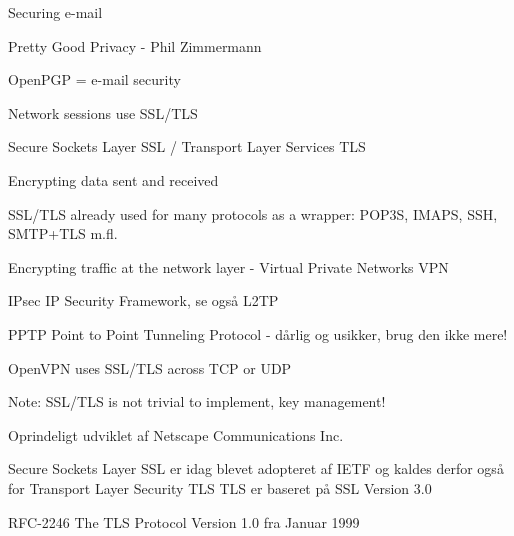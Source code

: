 \documentclass[20pt,landscape,a4paper,footrule]{foils}
\begin{document}
\begin{list1}
\item Securing e-mail
\begin{list2}
\item Pretty Good Privacy - Phil Zimmermann
\item OpenPGP = e-mail security
\end{list2}
\item Network sessions use SSL/TLS
\begin{list2}
\item Secure Sockets Layer SSL / Transport Layer Services TLS
\item Encrypting data sent and received
\item SSL/TLS already used for many protocols as a wrapper: POP3S, IMAPS, SSH, SMTP+TLS m.fl.
\end{list2}
\item Encrypting traffic at the network layer - Virtual Private Networks VPN
\begin{list2}
\item {\color{green}IPsec IP Security Framework, se også L2TP}
\item {\color{red} PPTP Point to Point Tunneling Protocol - dårlig og usikker, brug den ikke mere!}
\item OpenVPN uses SSL/TLS across TCP or UDP
\end{list2}
\end{list1}

\centerline{Note: SSL/TLS is not trivial to implement, key management!}



\begin{list1}
\item Oprindeligt udviklet af Netscape Communications Inc.
\item Secure Sockets Layer SSL er idag blevet adopteret af IETF og kaldes
derfor også for Transport Layer Security TLS
TLS er baseret på SSL Version 3.0
\item RFC-2246 The TLS Protocol Version 1.0 fra Januar 1999
\end{list1}



\end{document}
